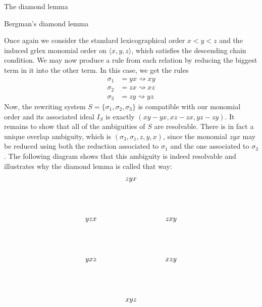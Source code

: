 \begin{chapter}{The diamond lemma}
\begin{section}{Bergman's diamond lemma}
\begin{exmp}
Once again we consider the standard lexicographical order $x<y<z$ and the induced grlex monomial order on $\langle x,y,z\rangle$, which satisfies the descending chain condition. We may now produce a rule from each relation by reducing the biggest term in it into the other term. In this case, we get the rules
\begin{align*}
\sigma_1 &= yx \rightsquigarrow xy\\
\sigma_2 &= zx \rightsquigarrow xz\\
\sigma_3 &= zy \rightsquigarrow yz
\end{align*}
Now, the rewriting system $S=\{\sigma_1, \sigma_2, \sigma_3\}$ is compatible with our monomial order and its associated ideal $I_S$ is exactly $(xy-yx, xz-zx, yz-zy)$. It remains to show that all of the ambiguities of $S$ are resolvable. There is in fact a unique overlap ambiguity, which is $(\sigma_3, \sigma_1, z, y, x)$, since the monomial $zyx$ may be reduced using both the reduction associated to $\sigma_1$ and the one associated to $\sigma_3$. The following diagram shows that this ambiguity is indeed resolvable and illustrates why the diamond lemma is called that way:
\[
\begin{tikzpicture}
\node (1) at (0,0) {$zyx$};
\node (a1) at (-2,-2) {$yzx$};
\node (a2) at (2,-2) {$zxy$};
\node (b1) at (-2,-4) {$yxz$};
\node (b2) at (2,-4) {$xzy$};
\node (c) at (0,-6) {$xyz$};


\end{tikzpicture}\]
\end{exmp}
\end{section}
\end{chapter}
